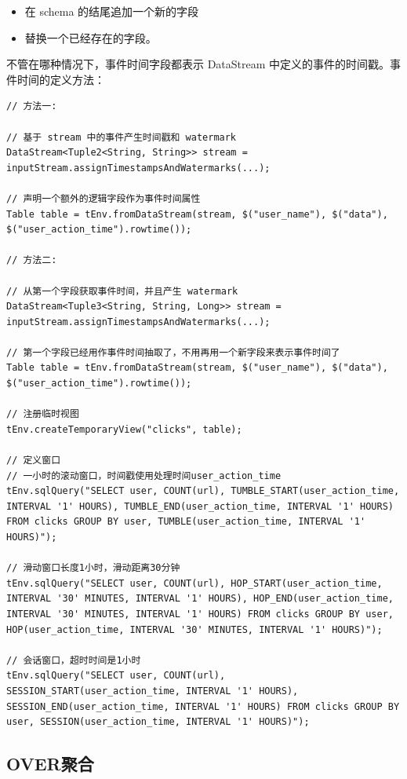 \documentclass[cn,11pt,chinese]{elegantbook}
\begin{document}
\begin{itemize}
  \item 在 schema 的结尾追加一个新的字段
  \item 替换一个已经存在的字段。
\end{itemize}

不管在哪种情况下，事件时间字段都表示 DataStream 中定义的事件的时间戳。事件时间的定义方法：

\begin{verbatim}
// 方法一:

// 基于 stream 中的事件产生时间戳和 watermark
DataStream<Tuple2<String, String>> stream = inputStream.assignTimestampsAndWatermarks(...);

// 声明一个额外的逻辑字段作为事件时间属性
Table table = tEnv.fromDataStream(stream, $("user_name"), $("data"), $("user_action_time").rowtime());

// 方法二:

// 从第一个字段获取事件时间，并且产生 watermark
DataStream<Tuple3<String, String, Long>> stream = inputStream.assignTimestampsAndWatermarks(...);

// 第一个字段已经用作事件时间抽取了，不用再用一个新字段来表示事件时间了
Table table = tEnv.fromDataStream(stream, $("user_name"), $("data"), $("user_action_time").rowtime());

// 注册临时视图
tEnv.createTemporaryView("clicks", table);

// 定义窗口
// 一小时的滚动窗口，时间戳使用处理时间user_action_time
tEnv.sqlQuery("SELECT user, COUNT(url), TUMBLE_START(user_action_time, INTERVAL '1' HOURS), TUMBLE_END(user_action_time, INTERVAL '1' HOURS) FROM clicks GROUP BY user, TUMBLE(user_action_time, INTERVAL '1' HOURS)");

// 滑动窗口长度1小时，滑动距离30分钟
tEnv.sqlQuery("SELECT user, COUNT(url), HOP_START(user_action_time, INTERVAL '30' MINUTES, INTERVAL '1' HOURS), HOP_END(user_action_time, INTERVAL '30' MINUTES, INTERVAL '1' HOURS) FROM clicks GROUP BY user, HOP(user_action_time, INTERVAL '30' MINUTES, INTERVAL '1' HOURS)");

// 会话窗口，超时时间是1小时
tEnv.sqlQuery("SELECT user, COUNT(url), SESSION_START(user_action_time, INTERVAL '1' HOURS), SESSION_END(user_action_time, INTERVAL '1' HOURS) FROM clicks GROUP BY user, SESSION(user_action_time, INTERVAL '1' HOURS)");
\end{verbatim}

\subsection{OVER聚合}
\end{document}
